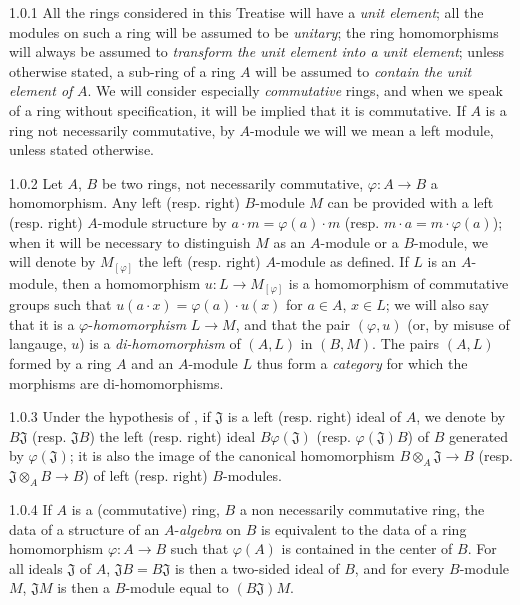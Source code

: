\documentclass[../main.tex]{subfiles}
\begin{document}
\begin{env}{1.0.1}
All the rings considered in this Treatise will have a \emph{unit element}; all the modules
on such a ring will be assumed to be \emph{unitary}; the ring homomorphisms will always be
assumed to \emph{transform the unit element into a unit element}; unless otherwise stated,
a sub-ring of a ring $A$ will be assumed to \emph{contain the unit element of} $A$. We will
consider especially \emph{commutative} rings, and when we speak of a ring without
specification, it
will be implied that it is commutative. If $A$ is a ring not necessarily commutative, by
$A$-module we will we mean a left module, unless stated otherwise.
\end{env}

\begin{env}{1.0.2}
Let $A$, $B$ be two rings, not necessarily commutative, $\varphi\colon A\to B$ a homomorphism.
Any left (resp. right) $B$-module $M$ can be provided with a left (resp. right) $A$-module
structure by $a\cdot m=\varphi(a)\cdot m$ (resp. $m\cdot a=m\cdot\varphi(a)$); when it will
be necessary to distinguish $M$ as an $A$-module or a $B$-module, we will denote by
$M_{[\varphi]}$ the left (resp. right) $A$-module as defined. If $L$ is an $A$-module, then
a homomorphism $u\colon L\to M_{[\varphi]}$ is a homomorphism of commutative groups such that
$u(a\cdot x)=\varphi(a)\cdot u(x)$ for $a\in A$, $x\in L$; we will also say that it is a
$\varphi$-\emph{homomorphism} $L\to M$,
and that the pair $(\varphi,u)$ (or, by misuse of langauge, $u$)
is a \emph{di-homomorphism} of $(A,L)$ in $(B,M)$. The pairs $(A,L)$ formed by a ring $A$
and an $A$-module $L$ thus form a \emph{category} for which the morphisms are
di-homomorphisms.
\end{env}

\begin{env}{1.0.3}
Under the hypothesis of , if $\mathfrak{J}$ is a left (resp. right) ideal of $A$, we
denote by $B\mathfrak{J}$ (resp. $\mathfrak{J}B$) the left (resp. right) ideal $B\varphi(\mathfrak{J})$
(resp. $\varphi(\mathfrak{J})B$) of $B$ generated by $\varphi(\mathfrak{J})$; it is also the image
of the canonical homomorphism $B\otimes_A\mathfrak{J}\to B$ (resp. $\mathfrak{J}\otimes_A B\to B$)
of left (resp. right) $B$-modules.
\end{env}

\begin{env}{1.0.4}
If $A$ is a (commutative) ring, $B$ a non necessarily commutative ring, the data of
a structure of an $A$-\emph{algebra} on $B$ is equivalent to the data of a ring
homomorphism $\varphi\colon A\to B$ such that $\varphi(A)$ is contained in the center of $B$.
For all ideals $\mathfrak{J}$ of $A$, $\mathfrak{J}B=B\mathfrak{J}$ is then a two-sided ideal of $B$, and
for every $B$-module $M$, $\mathfrak{J}M$ is then a $B$-module equal to $(B\mathfrak{J})M$.
\end{env}
\end{document}
